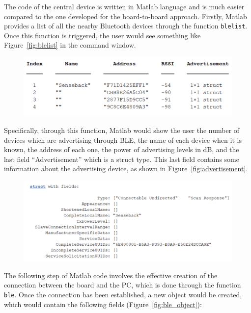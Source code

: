 \documentclass{Configuration_Files/PoliMi3i_thesis}
\begin{document}
The code of the central device is written in Matlab language and is much easier compared to the one developed for the board-to-board approach. Firstly, Matlab provides a list of all the nearby Bluetooth devices through the function \texttt{blelist}. Once this function is triggered, the user would see something like Figure~\ref{fig:blelist} in the command window.

\begin{figure}[H]
    \centering
    \includegraphics[scale=0.3]{Board Windows PC/2.png}
    \label{fig:nrf_connect_log}
\end{figure}

Specifically, through this function, Matlab would show the user the number of devices which are advertising through BLE, the name of each device when it is known, the address of each one, the power of advertising levels in dB, and the last field “Advertisement” which is a struct type. This last field contains some information about the advertising device, as shown in Figure~\ref{fig:advertisement}.

\begin{figure}[H]
    \centering
    \includegraphics[scale=0.3]{Board Windows PC/3.png}
    \label{fig:nrf_connect_log}
\end{figure}

The following step of Matlab code involves the effective creation of the connection between the board and the PC, which is done through the function \texttt{ble}. Once the connection has been established, a new object would be created, which would contain the following fields (Figure~\ref{fig:ble_object}):
\end{document}
